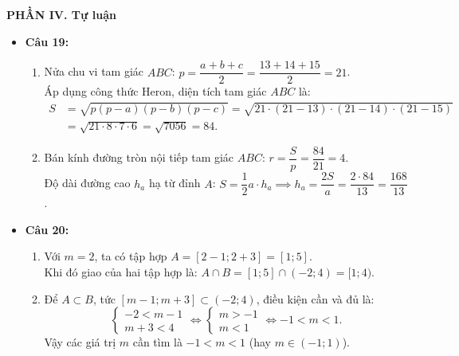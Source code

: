 \documentclass[12pt,a4paper]{article}
\begin{document}
\vspace{0.15cm}
\textbf{PHẦN IV. Tự luận}
\begin{itemize}[leftmargin=0.6cm, itemsep=2pt, topsep=1pt]
    \item \textbf{Câu 19:}
    \begin{enumerate}[label=\alph*), itemsep=1pt]
        \item Nửa chu vi tam giác $ABC$: $p = \dfrac{a + b + c}{2} = \dfrac{13 + 14 + 15}{2} = 21$.\\
        Áp dụng công thức Heron, diện tích tam giác $ABC$ là:
        \[
        \begin{aligned}
        S &= \sqrt{p(p - a)(p - b)(p - c)} = \sqrt{21 \cdot (21 - 13) \cdot (21 - 14) \cdot (21 - 15)} \\
        &= \sqrt{21 \cdot 8 \cdot 7 \cdot 6} = \sqrt{7056} = 84.
        \end{aligned}
        \]
        \item Bán kính đường tròn nội tiếp tam giác $ABC$: $r = \dfrac{S}{p} = \dfrac{84}{21} = 4$.\\
        Độ dài đường cao $h_a$ hạ từ đỉnh $A$: $S = \dfrac{1}{2} a \cdot h_a \implies h_a = \dfrac{2S}{a} = \dfrac{2 \cdot 84}{13} = \dfrac{168}{13}$.
    \end{enumerate}

    \item \textbf{Câu 20:}
    \begin{enumerate}[label=\alph*), itemsep=1pt]
        \item Với $m = 2$, ta có tập hợp $A = [2 - 1; 2 + 3] = [1; 5]$.\\
        Khi đó giao của hai tập hợp là: $A \cap B = [1; 5] \cap (-2; 4) = [1; 4)$.
        \item Để $A \subset B$, tức $[m - 1; m + 3] \subset (-2; 4)$, điều kiện cần và đủ là:
        \[
        \begin{cases} -2 < m - 1 \\ m + 3 < 4 \end{cases} \iff \begin{cases} m > -1 \\ m < 1 \end{cases} \iff -1 < m < 1.
        \]
        Vậy các giá trị $m$ cần tìm là $-1 < m < 1$ (hay $m \in (-1; 1)$).
    \end{enumerate}


\end{itemize}
\end{document}
